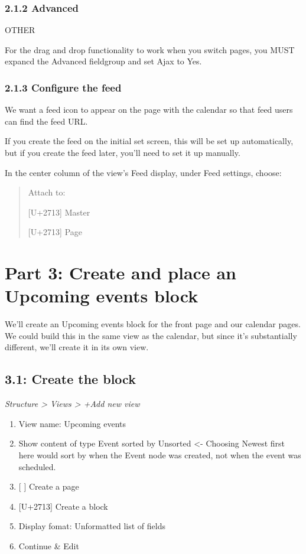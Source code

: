 \documentclass[letterpaper,10pt,english]{sphinxmanual}
\begin{document}
\subsection{2.1.2 Advanced}
\label{event_calendar:advanced}
OTHER

For the drag and drop functionality to work when you switch pages, you MUST expancd the Advanced fieldgroup and set Ajax to Yes.


\subsection{2.1.3 Configure the feed}
\label{event_calendar:configure-the-feed}
We want a feed icon to appear on the page with the calendar so that feed users can find the feed URL.

If you create the feed on the initial set screen, this will be set up automatically, but if you create the feed later, you'll need to set it up manually.

In the center column of the view's Feed display, under Feed settings, choose:
\begin{quote}

Attach to:

{[}U+2713{]} Master

{[}U+2713{]} Page
\end{quote}


\chapter{Part 3: Create and place an Upcoming events block}
\label{event_calendar:part-3-create-and-place-an-upcoming-events-block}
We'll create an Upcoming events block for the front page and our calendar pages. We could build this in the same view as the calendar, but since it's substantially different, we'll create it in its own view.


\section{3.1: Create the block}
\label{event_calendar:create-the-block}
\emph{Structure \textgreater{} Views \textgreater{} +Add new view}
\begin{enumerate}
\item {} 
View name: Upcoming events

\item {} 
Show content of type Event sorted by Unsorted \textless{}- Choosing Newest first here would sort by when the Event node was created, not when the event was scheduled.

\item {} 
{[} {]} Create a page

\item {} 
{[}U+2713{]} Create a block

\item {} 
Display fomat: Unformatted list of fields

\item {} 
Continue \& Edit

\end{enumerate}
\end{document}
